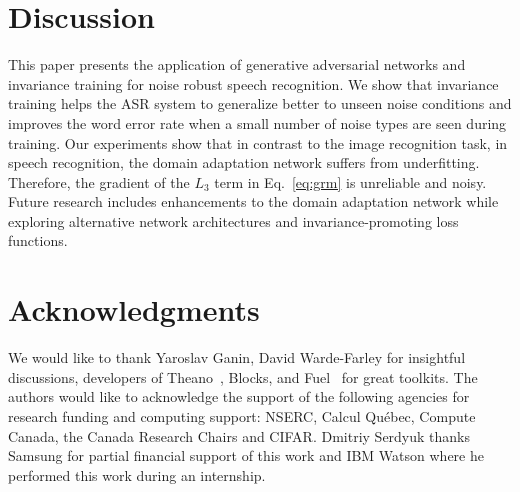 \documentclass[a4paper]{article}
\begin{document}
\section{Discussion}
\label{sec:discussion}
    This paper presents the application of generative adversarial networks and 
    invariance training for noise robust speech recognition. We show that invariance training 
    helps the ASR system to generalize better to unseen noise conditions and improves 
    the word error rate when a small number of noise types are seen during training. Our 
    experiments show that in contrast to the image recognition task, in speech 
    recognition, the domain adaptation network suffers from underfitting. Therefore, the 
    gradient of the $L_3$ term in Eq.~\ref{eq:grm} is unreliable and noisy. Future 
    research includes enhancements to the domain adaptation network while exploring 
    alternative network architectures and invariance-promoting loss functions.

\section{Acknowledgments}

We would like to thank Yaroslav Ganin, David Warde-Farley for insightful discussions,
developers of Theano~\citep{theano2016theano}, Blocks, and Fuel~\citep{MerrienboerBDSW15} 
for great toolkits. 
The authors would like to acknowledge the support of the following agencies for
research funding and computing support: NSERC, Calcul Qu\'{e}bec, Compute Canada,
the Canada Research Chairs and CIFAR. Dmitriy Serdyuk thanks Samsung for partial
financial support of this work and IBM Watson where he performed this work 
during an internship.




\end{document}

